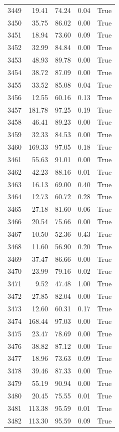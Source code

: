\begin{longtable}{rrrrr}
3449 & 19.41 & 74.24 & 0.04 & True \\
3450 & 35.75 & 86.02 & 0.00 & True \\
3451 & 18.94 & 73.60 & 0.09 & True \\
3452 & 32.99 & 84.84 & 0.00 & True \\
3453 & 48.93 & 89.78 & 0.00 & True \\
3454 & 38.72 & 87.09 & 0.00 & True \\
3455 & 33.52 & 85.08 & 0.04 & True \\
3456 & 12.55 & 60.16 & 0.13 & True \\
3457 & 181.78 & 97.25 & 0.19 & True \\
3458 & 46.41 & 89.23 & 0.00 & True \\
3459 & 32.33 & 84.53 & 0.00 & True \\
3460 & 169.33 & 97.05 & 0.18 & True \\
3461 & 55.63 & 91.01 & 0.00 & True \\
3462 & 42.23 & 88.16 & 0.01 & True \\
3463 & 16.13 & 69.00 & 0.40 & True \\
3464 & 12.73 & 60.72 & 0.28 & True \\
3465 & 27.18 & 81.60 & 0.06 & True \\
3466 & 20.54 & 75.66 & 0.00 & True \\
3467 & 10.50 & 52.36 & 0.43 & True \\
3468 & 11.60 & 56.90 & 0.20 & True \\
3469 & 37.47 & 86.66 & 0.00 & True \\
3470 & 23.99 & 79.16 & 0.02 & True \\
3471 & 9.52 & 47.48 & 1.00 & True \\
3472 & 27.85 & 82.04 & 0.00 & True \\
3473 & 12.60 & 60.31 & 0.17 & True \\
3474 & 168.44 & 97.03 & 0.00 & True \\
3475 & 23.47 & 78.69 & 0.00 & True \\
3476 & 38.82 & 87.12 & 0.00 & True \\
3477 & 18.96 & 73.63 & 0.09 & True \\
3478 & 39.46 & 87.33 & 0.00 & True \\
3479 & 55.19 & 90.94 & 0.00 & True \\
3480 & 20.45 & 75.55 & 0.01 & True \\
3481 & 113.38 & 95.59 & 0.01 & True \\
3482 & 113.30 & 95.59 & 0.09 & True \\

\end{longtable}
